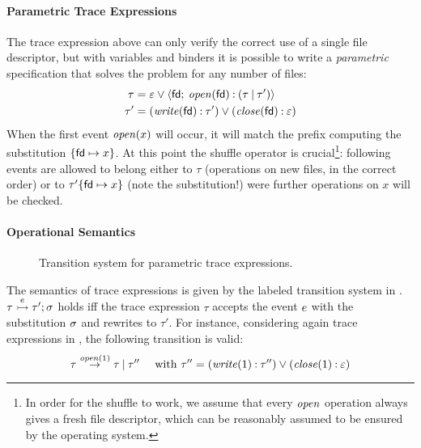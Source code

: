 
\paragraph{Parametric Trace Expressions}
The trace expression above can only verify the correct use of a single file descriptor, but with variables and binders \cite{AnconaFM17} it is possible to write a \emph{parametric} specification that solves the problem for any number of files:
\begin{align}
\label{eq:files1}
\tau &= \varepsilon \mathbin{\vee} {\langle}\mathsf{fd};\:{\mathit{open}(\mathsf{fd}) \mathbin{:} (\tau \mathbin{|} \tau')}{\rangle}\\
\label{eq:files2}
\tau' &= (\mathit{write}(\mathsf{fd}) \mathbin{:} \tau') \mathbin{\vee} (\mathit{close}(\mathsf{fd}) \mathbin{:} \varepsilon)
\end{align}
When the first event \(\mathit{open}(x)\) will occur, it will match the prefix computing the substitution \(\{\mathsf{fd}\mapsto x\}\).
At this point the shuffle operator is crucial\footnote{In order for the shuffle to work, we assume that every \(\mathit{open}\) operation always gives a fresh file descriptor, which can be reasonably assumed to be ensured by the operating system.}: following events are allowed to belong either to \(\tau\) (operations on new files, in the correct order) or to \(\tau'\{\mathsf{fd}\mapsto x\}\) (note the substitution!) were further operations on \(x\) will be checked.

\paragraph{Operational Semantics}
\begin{figure}[t]

\caption{Transition system for parametric trace expressions.}
\label{fig:semantics}
\end{figure}
The semantics of trace expressions is given by the labeled transition system in .
\( \tau \stackrel{{e}}{\rightarrowtail} \tau';\sigma \) holds iff the trace expression \(\tau\) accepts the event \(e\) with the substitution \(\sigma\) and rewrites to \(\tau'\).
For instance, considering again trace expressions in , the following transition is valid:
\[
  \tau \stackrel{{\mathit{open}(1)}}{\rightarrow} \tau\mathbin{|} \tau'' \quad \mbox{ with }
  \tau''= (\mathit{write}(1) \mathbin{:} \tau'') \mathbin{\vee} (\mathit{close}(1) \mathbin{:} \varepsilon)
\]

